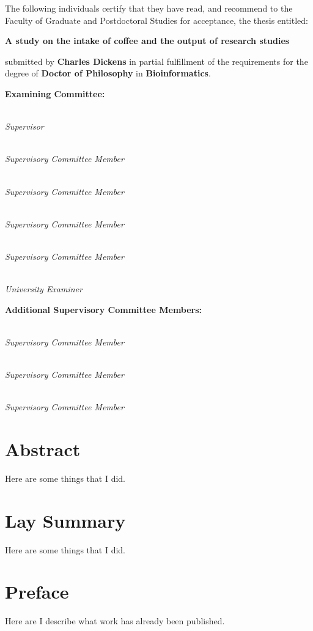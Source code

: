 
\noindent The following individuals certify that they have read,
and recommend to the Faculty of Graduate and Postdoctoral Studies
for acceptance, the thesis entitled:

\begin{center}
{\large \textbf{A study on the intake of coffee and the output of research studies}}
\end{center}

submitted by \textbf{Charles Dickens} in partial fulfillment of the requirements for the degree of \textbf{Doctor of Philosophy} in \textbf{Bioinformatics}.%
\par\bigskip%

\noindent\textbf{Examining Committee:}%
\par\medskip{}\\\emph{Supervisor}
\par\medskip{}\\\emph{Supervisory Committee Member}
\par\medskip{}\\\emph{Supervisory Committee Member}
\par\medskip{}\\\emph{Supervisory Committee Member}
\par\medskip{}\\\emph{Supervisory Committee Member}
\par\medskip{}\\\emph{University Examiner}
\par\bigskip%
\noindent\textbf{Additional Supervisory Committee Members:}%
\par\medskip{}\\\emph{Supervisory Committee Member}
\par\medskip{}\\\emph{Supervisory Committee Member}
\par\medskip{}\\\emph{Supervisory Committee Member}
\cleardoublepage

\chapter{Abstract}

Here are some things that I did.

\chapter{Lay Summary}

Here are some things that I did.

\chapter{Preface}

Here are I describe what work has already been published.



